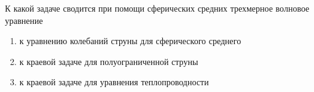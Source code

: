 К какой задаче сводится при помощи сферических средних трехмерное волновое уравнение

\begin{enumerate}[label=\arabic*)]
    \item к уравнению колебаний струны для сферического среднего
    \item к краевой задаче для полуограниченной струны
    \item к краевой задаче для уравнения теплопроводности
\end{enumerate}

